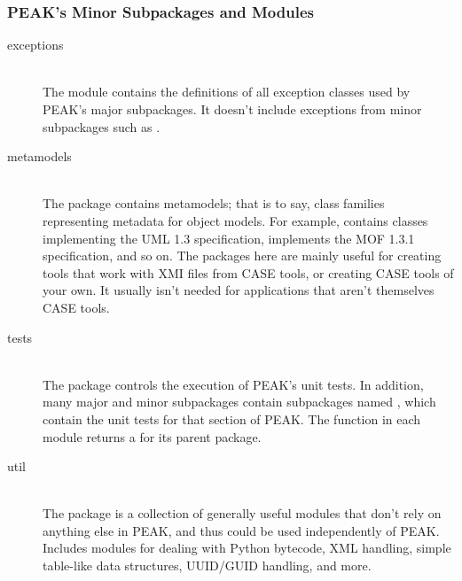 \subsubsection{PEAK's Minor Subpackages and Modules}

\begin{description}

\item[exceptions] \hfill \\
The  module contains the definitions of all exception
classes used by PEAK's major subpackages.  It doesn't include exceptions from
minor subpackages such as .

\item[metamodels] \hfill \\
The  package contains metamodels; that is to say,
class families representing metadata for object models.  For example,
 contains classes implementing the UML 1.3
specification,  implements the MOF 1.3.1
specification, and so on.  The packages here are mainly useful for creating
tools that work with XMI files from CASE tools, or creating CASE tools of your
own.  It usually isn't needed for applications that aren't themselves CASE
tools.

\item[tests] \hfill \\
The  package controls the execution of PEAK's unit tests.
In addition, many major and minor subpackages contain subpackages named
, which contain the unit tests for that section of PEAK.  The
 function in each  module returns a
 for its parent package.

\item[util] \hfill \\
The  package is a collection of generally useful modules
that don't rely on anything else in PEAK, and thus could be used
independently of PEAK.  Includes modules for dealing with Python bytecode,
XML handling, simple table-like data structures, UUID/GUID handling, and more.

\end{description}

